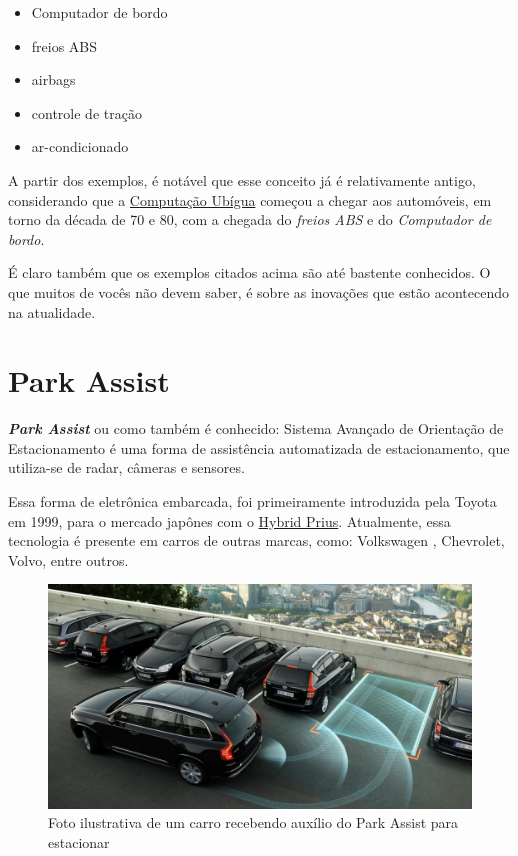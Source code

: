 \documentclass[12pt]{article}
\begin{document}
    \begin{itemize}

        \item Computador de bordo 
        
        \item freios ABS
        
        \item airbags 
        
        \item controle de tração
        
        \item ar-condicionado
        
    \end{itemize}

    A partir dos exemplos, é notável que esse conceito já é relativamente antigo, considerando
    que a \href{https://canaltech.com.br/produtos/O-que-e-Computacao-Ubiqua/}{Computação Ubígua} 
    começou a chegar aos automóveis, em torno da década de 70 e 80, com a chegada
    do \emph{freios ABS} e do \emph{Computador de bordo}.

    É claro também que os exemplos citados acima são até bastente conhecidos. O que muitos de vocês
    não devem saber, é sobre as inovações que estão acontecendo na atualidade.

    \newpage

    \section{Park Assist}

    \textbf{\emph{Park Assist}} ou como também é conhecido: Sistema Avançado de Orientação de Estacionamento 
    é uma forma de assistência automatizada de estacionamento, que utiliza-se de radar, câmeras e sensores.
    
    Essa forma de eletrônica embarcada, foi primeiramente introduzida pela Toyota em 1999, para o mercado 
    japônes com o \href{https://en.wikipedia.org/wiki/Toyota_Prius}{Hybrid Prius}. Atualmente, 
    essa tecnologia é presente em carros de outras marcas, como: Volkswagen , Chevrolet, Volvo, entre outros.
    \begin{figure}[htp]

        \centering
        \includegraphics[scale=0.2]{ParkAssist.png}
        \caption{\centering Foto ilustrativa de um carro recebendo auxílio do Park Assist para estacionar}

    \end{figure}
\end{document}
